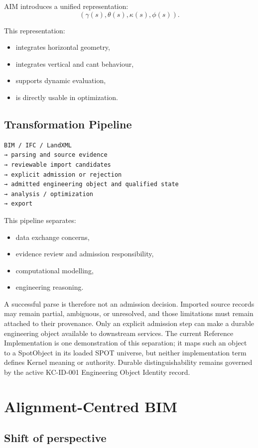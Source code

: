 AIM introduces a unified representation:
\[
(\gamma(s), \theta(s), \kappa(s), \phi(s)).
\]

This representation:
\begin{itemize}
\item integrates horizontal geometry,
\item integrates vertical and cant behaviour,
\item supports dynamic evaluation,
\item is directly usable in optimization.
\end{itemize}


\subsection{Transformation Pipeline}

\begin{verbatim}
BIM / IFC / LandXML
→ parsing and source evidence
→ reviewable import candidates
→ explicit admission or rejection
→ admitted engineering object and qualified state
→ analysis / optimization
→ export
\end{verbatim}

This pipeline separates:
\begin{itemize}
\item data exchange concerns,
\item evidence review and admission responsibility,
\item computational modelling,
\item engineering reasoning.
\end{itemize}

A successful parse is therefore not an admission decision. Imported source
records may remain partial, ambiguous, or unresolved, and those limitations
must remain attached to their provenance. Only an explicit admission step can
make a durable engineering object available to downstream services. The
current Reference Implementation is one demonstration of this separation; it
maps such an object to a SpotObject in its loaded SPOT universe, but neither
implementation term defines Kernel meaning or authority. Durable
distinguishability remains governed by the active KC-ID-001 Engineering Object
Identity record.


\section{Alignment-Centred BIM}

\subsection{Shift of perspective}

